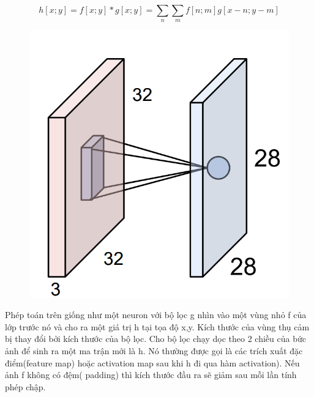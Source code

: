 \begin{center}
	\begin{equation}
	 h[x; y] = f[x; y] * g[x; y] = \displaystyle \sum_{n}\displaystyle \sum_{m}f[n; m]g[x - n; y - m]
	\end{equation}
\end{center}
\begin{center}
    \begin{figure}[H]
    \begin{center}
     \includegraphics[scale=.5]{image/neuronView.PNG}
    \end{center}
    \caption{}
    \label{fig:conv_operation}
    \end{figure}
\end{center}

Phép toán trên giống như một neuron với bộ lọc g nhìn vào một vùng nhỏ f của lớp trước nó và cho ra một giá trị h tại tọa độ x,y. Kích thước của vùng thụ cảm bị thay đổi bởi kích thước của bộ lọc. Cho bộ lọc chạy dọc theo 2 chiều của bức ảnh để sinh ra một ma trận mới là h. Nó thường được gọi là các trích xuất đặc điểm(feature map) hoặc activation map sau khi h đi qua hàm activation). Nếu ảnh f không có đệm( padding) thì kích thước đầu ra sẽ giảm sau mỗi lần tính phép chập.\\


